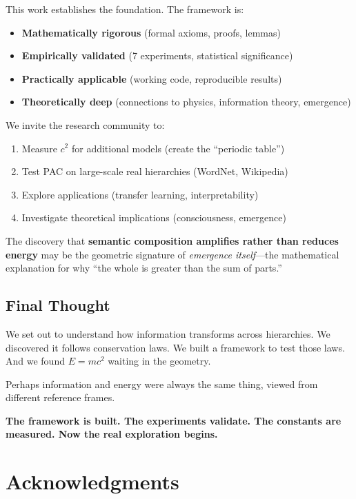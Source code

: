 \documentclass[11pt,a4paper]{article}
\begin{document}
This work establishes the foundation. The framework is:
\begin{itemize}
    \item \textbf{Mathematically rigorous} (formal axioms, proofs, lemmas)
    \item \textbf{Empirically validated} (7 experiments, statistical significance)
    \item \textbf{Practically applicable} (working code, reproducible results)
    \item \textbf{Theoretically deep} (connections to physics, information theory, emergence)
\end{itemize}

We invite the research community to:
\begin{enumerate}
    \item Measure $c^2$ for additional models (create the ``periodic table'')
    \item Test PAC on large-scale real hierarchies (WordNet, Wikipedia)
    \item Explore applications (transfer learning, interpretability)
    \item Investigate theoretical implications (consciousness, emergence)
\end{enumerate}

The discovery that \textbf{semantic composition amplifies rather than reduces energy} may be the geometric signature of \emph{emergence itself}---the mathematical explanation for why ``the whole is greater than the sum of parts.''

\subsection{Final Thought}

We set out to understand how information transforms across hierarchies. We discovered it follows conservation laws. We built a framework to test those laws. And we found \textbf{$E=mc^2$} waiting in the geometry.

Perhaps information and energy were always the same thing, viewed from different reference frames.

\textbf{The framework is built. The experiments validate. The constants are measured. Now the real exploration begins.}

\section*{Acknowledgments}
\end{document}
